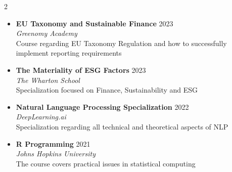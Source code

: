 \begin{cventries}
\begin{multicols}{2}
\begin{itemize}[leftmargin=*,nosep,label={}]
    \item \textbf{EU Taxonomy and Sustainable Finance} \hfill {\color{awesome-skyblue} 2023} \\
    \textit{Greenomy Academy} \\
    Course regarding EU Taxonomy Regulation and how to successfully implement reporting requirements
    \vspace{5pt}
    
    \item \textbf{The Materiality of ESG Factors} \hfill {\color{awesome-skyblue} 2023} \\
    \textit{The Wharton School} \\
    Specialization focused on Finance, Sustainability and ESG
    \vspace{5pt}
    
    \item \textbf{Natural Language Processing Specialization} \hfill {\color{awesome-skyblue} 2022} \\
    \textit{DeepLearning.ai} \\
    Specialization regarding all technical and theoretical aspects of NLP
    \vspace{5pt}
    
    \item \textbf{R Programming} \hfill {\color{awesome-skyblue} 2021} \\
    \textit{Johns Hopkins University} \\
    The course covers practical issues in statistical computing
\end{itemize}
\end{multicols}

\end{cventries}

